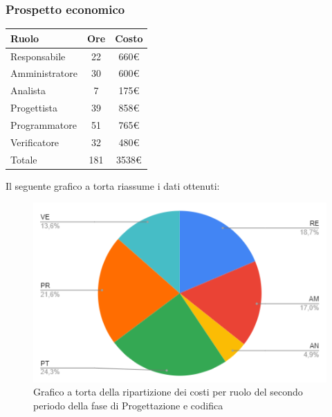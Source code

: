 {{{{{{{{{{{		\subsubsection{Prospetto economico}\label{PreventivoFaseDiProgettazioneDiDettaglioECodificaProspettoEconomicoPeriodo2}
		\quad
		\def\tabularxcolumn#1{m{#1}}
		{
			\begin{center}
				\renewcommand{\arraystretch}{1.4}
				\begin{tabularx}{7cm}{|X|c|c|}
					\hline
					\rowcolor{airforceblue}
					\textbf{Ruolo} & \textbf{Ore} & \textbf{Costo}\\
					\hline
					Responsabile & 22 & 660\euro\\
					\hline
					Amministratore & 30 & 600\euro\\
					\hline
					Analista & 7 & 175\euro\\
					\hline
					Progettista & 39 & 858\euro\\
					\hline
					Programmatore & 51 & 765\euro\\
					\hline
					Verificatore & 32 & 480\euro\\
					\hline
					Totale & 181 & 3538\euro\\
					\hline
				\end{tabularx}
			\end{center}

			Il seguente grafico a torta riassume i dati ottenuti:
			\begin{figure}[!ht]
				\begin{center}
					\includegraphics[width=0.8\linewidth]{../immagini/pdp/torta_progettazione_dettaglio_periodo2.png}
					\caption{Grafico a torta della ripartizione dei costi per ruolo del secondo periodo della fase di Progettazione e codifica}
				\end{center}
			\end{figure}

}}}}}}}}}}}}
